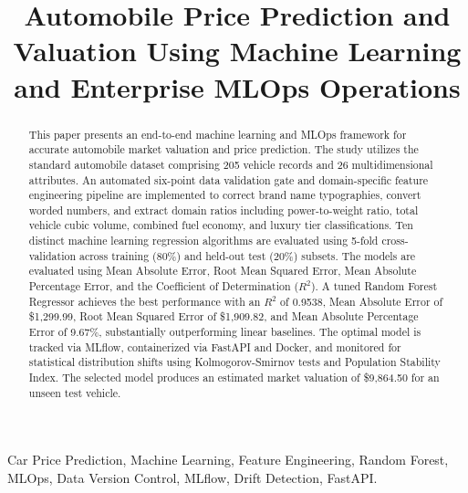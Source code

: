 \documentclass[conference]{IEEEtran}
\begin{document}
\title{Automobile Price Prediction and Valuation Using Machine Learning and Enterprise MLOps Operations}

\author{
}

\maketitle

\begin{abstract}
This paper presents an end-to-end machine learning and MLOps framework for accurate automobile market valuation and price prediction. The study utilizes the standard automobile dataset comprising 205 vehicle records and 26 multidimensional attributes. An automated six-point data validation gate and domain-specific feature engineering pipeline are implemented to correct brand name typographies, convert worded numbers, and extract domain ratios including power-to-weight ratio, total vehicle cubic volume, combined fuel economy, and luxury tier classifications. Ten distinct machine learning regression algorithms are evaluated using 5-fold cross-validation across training (80\%) and held-out test (20\%) subsets. The models are evaluated using Mean Absolute Error, Root Mean Squared Error, Mean Absolute Percentage Error, and the Coefficient of Determination ($R^2$). A tuned Random Forest Regressor achieves the best performance with an $R^2$ of 0.9538, Mean Absolute Error of \$1,299.99, Root Mean Squared Error of \$1,909.82, and Mean Absolute Percentage Error of 9.67\%, substantially outperforming linear baselines. The optimal model is tracked via MLflow, containerized via FastAPI and Docker, and monitored for statistical distribution shifts using Kolmogorov-Smirnov tests and Population Stability Index. The selected model produces an estimated market valuation of \$9,864.50 for an unseen test vehicle.
\end{abstract}

\begin{IEEEkeywords}
Car Price Prediction, Machine Learning, Feature Engineering, Random Forest, MLOps, Data Version Control, MLflow, Drift Detection, FastAPI.
\end{IEEEkeywords}
\end{document}
